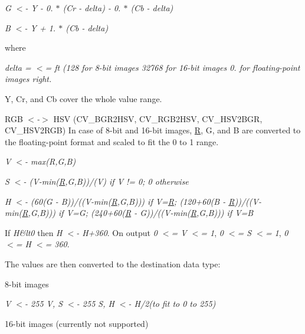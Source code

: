 {\itshape G $<$-\/ Y -\/ 0. $\ast$ (Cr -\/ delta) -\/ 0. $\ast$ (Cb -\/ delta)}

{\itshape B $<$-\/ Y + 1. $\ast$ (Cb -\/ delta)}

where

{\itshape delta = $<$= ft (128 for 8-\/bit images 32768 for 16-\/bit images 0. for floating-\/point images right.}

Y, Cr, and Cb cover the whole value range.


\begin{DoxyItemize}
\item R\+GB {\itshape $<$-\/$>$} H\+SV ({\ttfamily C\+V\+\_\+\+B\+G\+R2\+H\+SV, C\+V\+\_\+\+R\+G\+B2\+H\+SV, C\+V\+\_\+\+H\+S\+V2\+B\+GR, C\+V\+\_\+\+H\+S\+V2\+R\+GB}) In case of 8-\/bit and 16-\/bit images, \mbox{\hyperlink{classorg_1_1opencv_1_1_r}{R}}, G, and B are converted to the floating-\/point format and scaled to fit the 0 to 1 range. 
\end{DoxyItemize}

{\itshape V $<$-\/ max(\+R,\+G,\+B)}

{\itshape S $<$-\/ (V-\/min(\mbox{\hyperlink{classorg_1_1opencv_1_1_r}{R}},G,B))/(V) if V != 0; 0 otherwise}

{\itshape H $<$-\/ (60(G -\/ B))/((V-\/min(\mbox{\hyperlink{classorg_1_1opencv_1_1_r}{R}},G,B))) if V=\mbox{\hyperlink{classorg_1_1opencv_1_1_r}{R}}; (120+60(B -\/ \mbox{\hyperlink{classorg_1_1opencv_1_1_r}{R}}))/((V-\/min(\mbox{\hyperlink{classorg_1_1opencv_1_1_r}{R}},G,B))) if V=G; (240+60(\mbox{\hyperlink{classorg_1_1opencv_1_1_r}{R}} -\/ G))/((V-\/min(\mbox{\hyperlink{classorg_1_1opencv_1_1_r}{R}},G,B))) if V=B}

If {\itshape H\&lt0} then {\itshape H $<$-\/ H+360}. On output {\itshape 0 $<$= V $<$= 1}, {\itshape 0 $<$= S $<$= 1}, {\itshape 0 $<$= H $<$= 360}.

The values are then converted to the destination data type\+:


\begin{DoxyItemize}
\item 8-\/bit images 
\end{DoxyItemize}

{\itshape V $<$-\/ 255 V, S $<$-\/ 255 S, H $<$-\/ H/2(to fit to 0 to 255)}


\begin{DoxyItemize}
\item 16-\/bit images (currently not supported) 
\end{DoxyItemize}

